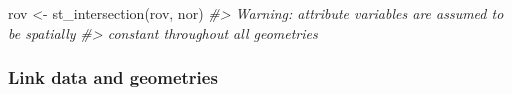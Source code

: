 \documentclass[
]{book}
\newenvironment{Shaded}{\begin{snugshade}}{\end{snugshade}}
\newcommand{\CommentTok}[1]{\textcolor[rgb]{0.56,0.35,0.01}{\textit{#1}}}
\newcommand{\FunctionTok}[1]{\textcolor[rgb]{0.00,0.00,0.00}{#1}}
\newcommand{\NormalTok}[1]{#1}
\newcommand{\OtherTok}[1]{\textcolor[rgb]{0.56,0.35,0.01}{#1}}
\newcommand{\SpecialCharTok}[1]{\textcolor[rgb]{0.00,0.00,0.00}{#1}}
\begin{document}
\begin{Shaded}
\begin{Highlighting}[]
\NormalTok{rov }\OtherTok{\textless{}{-}} \FunctionTok{st\_intersection}\NormalTok{(rov, nor)}
\CommentTok{\#\textgreater{} Warning: attribute variables are assumed to be spatially}
\CommentTok{\#\textgreater{} constant throughout all geometries}
\end{Highlighting}
\end{Shaded}

\hypertarget{link-data-and-geometries}{%
\subsubsection{Link data and geometries}\label{link-data-and-geometries}}

\begin{Shaded}
\end{Shaded}
\end{document}
